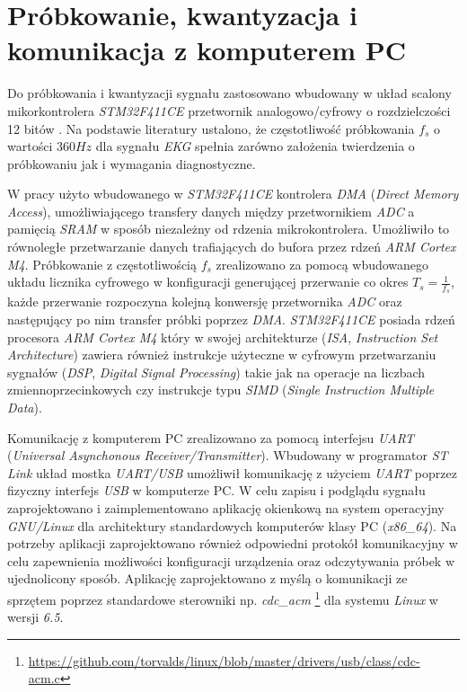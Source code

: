 \newpage

\section{Próbkowanie, kwantyzacja i komunikacja z komputerem PC}

Do próbkowania i kwantyzacji sygnału zastosowano wbudowany w układ scalony mikorkontrolera \textit{STM32F411CE} przetwornik analogowo/cyfrowy o rozdzielczości 12 bitów \cite{STM32F4DS}.
Na podstawie literatury \cite{Ajdaraga2018} ustalono, że częstotliwość próbkowania $f_{s}$ o wartości $360 Hz$ dla sygnału \textit{EKG} spełnia zarówno założenia twierdzenia o próbkowaniu
jak i wymagania diagnostyczne.


W pracy użyto wbudowanego w \textit{STM32F411CE} kontrolera \textit{DMA} (\textit{Direct Memory Access}), umożliwiającego
transfery danych między przetwornikiem \textit{ADC} a pamięcią \textit{SRAM} w sposób niezależny od rdzenia mikrokontrolera. 
Umożliwiło to równoległe przetwarzanie danych trafiających do bufora przez rdzeń \textit{ARM Cortex M4}. 
Próbkowanie z częstotliwością $f_{s}$ zrealizowano za pomocą wbudowanego
układu licznika cyfrowego w konfiguracji generującej przerwanie co okres $T_{s} = \frac{1}{f_s}$, każde przerwanie rozpoczyna kolejną konwersję przetwornika
\textit{ADC} oraz następujący po nim transfer próbki poprzez \textit{DMA}.
\textit{STM32F411CE} posiada rdzeń procesora \textit{ARM Cortex M4} który w swojej architekturze 
(\textit{ISA}, \textit{Instruction Set Architecture}) zawiera również instrukcje użyteczne w cyfrowym przetwarzaniu sygnałów (\textit{DSP}, \textit{Digital Signal Processing}) \cite{CM4DSP} takie jak na operacje na liczbach zmiennoprzecinkowych czy
instrukcje typu \textit{SIMD} (\textit{Single Instruction Multiple Data}).


Komunikację z komputerem PC zrealizowano za pomocą interfejsu \textit{UART} (\textit{Universal Asynchonous Receiver/Transmitter}). 
Wbudowany w programator \textit{ST Link} układ mostka \textit{UART/USB} umożliwił komunikację z użyciem \textit{UART} poprzez fizyczny interfejs \textit{USB} w komputerze PC.
W celu zapisu i podglądu sygnału zaprojektowano i zaimplementowano aplikację okienkową na system operacyjny \textit{GNU/Linux} 
dla architektury standardowych komputerów klasy PC (\textit{x86\_64}).
Na potrzeby aplikacji zaprojektowano również odpowiedni protokół komunikacyjny w celu zapewnienia możliwości 
konfiguracji urządzenia oraz odczytywania próbek w ujednolicony sposób. 
Aplikację zaprojektowano z myślą o komunikacji ze sprzętem poprzez standardowe sterowniki 
np. \textit{cdc\_acm} \footnote{\url{https://github.com/torvalds/linux/blob/master/drivers/usb/class/cdc-acm.c}}
dla systemu \textit{Linux} w wersji \textit{6.5}.

